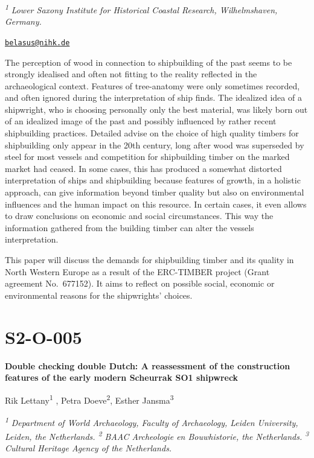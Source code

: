 \documentclass[
]{book}
\begin{document}
\textsuperscript{\emph{1}} \emph{Lower Saxony Institute for Historical Coastal Research, Wilhelmshaven, Germany.}

\href{mailto:belasus@nihk.de}{\nolinkurl{belasus@nihk.de}}

The perception of wood in connection to shipbuilding of the past seems to be strongly idealised and often not fitting to the reality reflected in the archaeological context. Features of tree-anatomy were only sometimes recorded, and often ignored during the interpretation of ship finds. The idealized idea of a shipwright, who is choosing personally only the best material, was likely born out of an idealized image of the past and possibly influenced by rather recent shipbuilding practices. Detailed advise on the choice of high quality timbers for shipbuilding only appear in the 20th century, long after wood was superseded by steel for most vessels and competition for shipbuilding timber on the marked market had ceased. In some cases, this has produced a somewhat distorted interpretation of ships and shipbuilding because features of growth, in a holistic approach, can give information beyond timber quality but also on environmental influences and the human impact on this resource. In certain cases, it even allows to draw conclusions on economic and social circumstances. This way the information gathered from the building timber can alter the vessels interpretation.

This paper will discuss the demands for shipbuilding timber and its quality in North Western Europe as a result of the ERC-TIMBER project (Grant agreement No.~677152). It aims to reflect on possible social, economic or environmental reasons for the shipwrights' choices.

\hypertarget{s2-o-005}{%
\section*{S2-O-005}\label{s2-o-005}}

\textbf{Double checking double Dutch: A reassessment of the construction features of the early modern Scheurrak SO1 shipwreck}

Rik Lettany\textsuperscript{1} , Petra Doeve\textsuperscript{2}, Esther Jansma\textsuperscript{3}

\textsuperscript{\emph{1}} \emph{Department of World Archaeology, Faculty of Archaeology, Leiden University, Leiden, the Netherlands. \textsuperscript{2} BAAC Archeologie en Bouwhistorie, the Netherlands. \textsuperscript{3} Cultural Heritage Agency of the Netherlands.}
\end{document}
